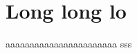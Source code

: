 \documentclass[12pt]{book}
\begin{document}
    \chapter{Long long lo}
    aaaaaaaaaaaaaaaaaaaaaaa sss
\end{document}
